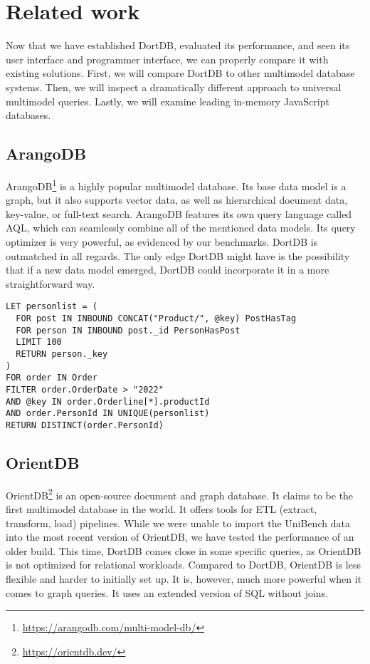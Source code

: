 \chapter{Related work}
\label{chap:related-work}

Now that we have established DortDB, evaluated its performance, and seen its user interface and programmer interface, we can properly compare it with existing solutions. First, we will compare DortDB to other multimodel database systems. Then, we will inspect a dramatically different approach to universal multimodel queries. Lastly, we will examine leading in-memory JavaScript databases.

\section{ArangoDB}

ArangoDB\footnote{\url{https://arangodb.com/multi-model-db/}} is a highly popular multimodel database. Its base data model is a graph, but it also supports vector data, as well as hierarchical document data, key-value, or full-text search. ArangoDB features its own query language called AQL, which can seamlessly combine all of the mentioned data models. Its query optimizer is very powerful, as evidenced by our benchmarks. DortDB is outmatched in all regards. The only edge DortDB might have is the possibility that if a new data model emerged, DortDB could incorporate it in a more straightforward way.

\begin{listing}[!ht]
\begin{verbatim}
LET personlist = (
  FOR post IN INBOUND CONCAT("Product/", @key) PostHasTag
  FOR person IN INBOUND post._id PersonHasPost
  LIMIT 100
  RETURN person._key
)
FOR order IN Order
FILTER order.OrderDate > "2022"
AND @key IN order.Orderline[*].productId
AND order.PersonId IN UNIQUE(personlist)
RETURN DISTINCT(order.PersonId)
\end{verbatim}
\caption{Example of an AQL query. It is the ArangoDB version of UniBench query 2. It selects customers who have bought a specific product and posted about it. The query combines graph and document models.}
\end{listing}

\section{OrientDB}

OrientDB\footnote{\url{https://orientdb.dev/}} is an open-source document and graph database. It claims to be the first multimodel database in the world. It offers tools for ETL (extract, transform, load) pipelines. While we were unable to import the UniBench data into the most recent version of OrientDB, we have tested the performance of an older build. This time, DortDB comes close in some specific queries, as OrientDB is not optimized for relational workloads. Compared to DortDB, OrientDB is less flexible and harder to initially set up. It is, however, much more powerful when it comes to graph queries. It uses an extended version of SQL without joins.

